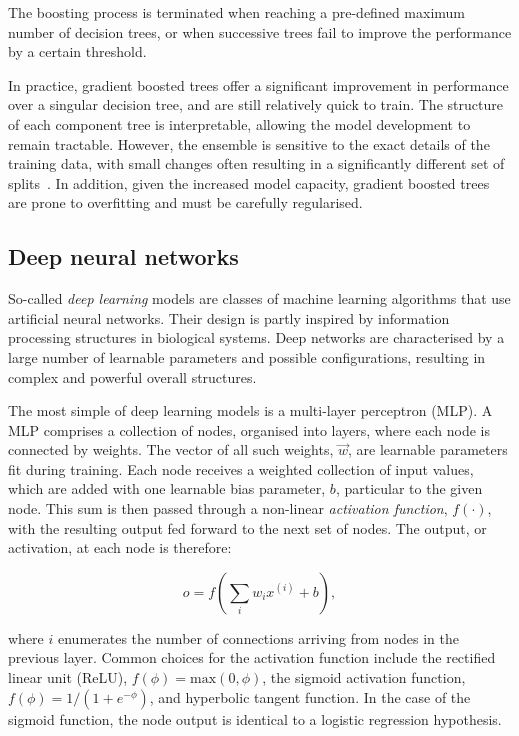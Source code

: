 \noindent The boosting process is terminated when reaching a pre-defined maximum number of decision trees, or when successive trees fail to improve the performance by a certain threshold.


In practice, gradient boosted trees offer a significant improvement in performance over a singular decision tree, and are still relatively quick to train. The structure of each component tree is interpretable, allowing the model development to remain tractable. However, the ensemble is sensitive to the exact details of the training data, with small changes often resulting in a significantly different set of splits~\cite{statistical_learning}. In addition, given the increased model capacity, gradient boosted trees are prone to overfitting and must be carefully regularised.

\subsection{Deep neural networks}


So-called \textit{deep learning} models are classes of machine learning algorithms that use artificial neural networks. Their design is partly inspired by information processing structures in biological systems. Deep networks are characterised by a large number of learnable parameters and possible configurations, resulting in complex and powerful overall structures.

The most simple of deep learning models is a multi-layer perceptron (MLP). 
A MLP comprises a collection of nodes, organised into layers, where each node is connected by weights. The vector of all such weights, $\vec{w}$, are learnable parameters fit during training. Each node receives a weighted collection of input values, which are added with one learnable bias parameter, $b$, particular to the given node. This sum is then passed through a non-linear \textit{activation function}, $f(\cdot)$, with the resulting output fed forward to the next set of nodes. The output, or activation, at each node is therefore:

\begin{equation}
    o = f\left(\sum_{i}w_{i}x^{(i)} + b\right), %
\end{equation}
    
\noindent where $i$ enumerates the number of connections arriving from nodes in the previous layer. Common choices for the activation function include the rectified linear unit (ReLU), $f(\phi)=\mathrm{max}(0,\phi)$,  the sigmoid activation function, $f(\phi)=1/(1+e^{-\phi})$, and hyperbolic tangent function. In the case of the sigmoid function, the node output is identical to a logistic regression hypothesis.

